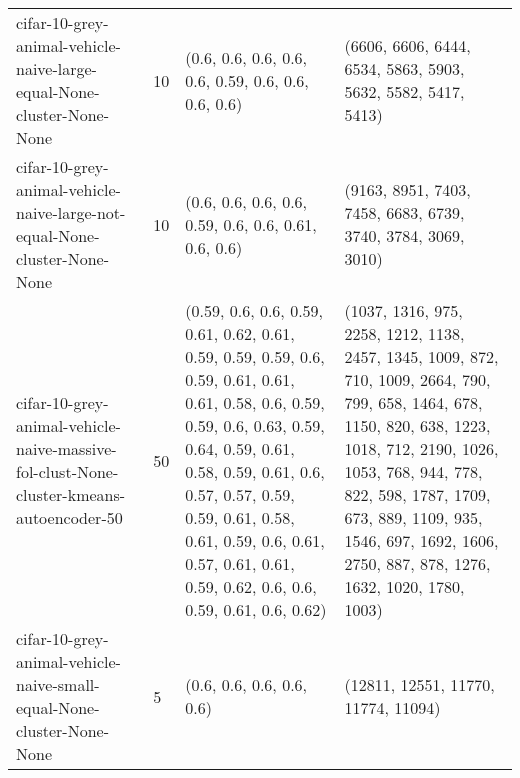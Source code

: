 \begin{longtable}{llll}
                                        cifar-10-grey-animal-vehicle-naive-large-equal-None-cluster-None-None &             10 &                                                                                                                                                                                                                                                       (0.6, 0.6, 0.6, 0.6, 0.6, 0.59, 0.6, 0.6, 0.6, 0.6) &                                                                                                                                                                                                                                              (6606, 6606, 6444, 6534, 5863, 5903, 5632, 5582, 5417, 5413) \\
                                    cifar-10-grey-animal-vehicle-naive-large-not-equal-None-cluster-None-None &             10 &                                                                                                                                                                                                                                                      (0.6, 0.6, 0.6, 0.6, 0.59, 0.6, 0.6, 0.61, 0.6, 0.6) &                                                                                                                                                                                                                                              (9163, 8951, 7403, 7458, 6683, 6739, 3740, 3784, 3069, 3010) \\
                      cifar-10-grey-animal-vehicle-naive-massive-fol-clust-None-cluster-kmeans-autoencoder-50 &             50 &        (0.59, 0.6, 0.6, 0.59, 0.61, 0.62, 0.61, 0.59, 0.59, 0.59, 0.6, 0.59, 0.61, 0.61, 0.61, 0.58, 0.6, 0.59, 0.59, 0.6, 0.63, 0.59, 0.64, 0.59, 0.61, 0.58, 0.59, 0.61, 0.6, 0.57, 0.57, 0.59, 0.59, 0.61, 0.58, 0.61, 0.59, 0.6, 0.61, 0.57, 0.61, 0.61, 0.59, 0.62, 0.6, 0.6, 0.59, 0.61, 0.6, 0.62) &                   (1037, 1316, 975, 2258, 1212, 1138, 2457, 1345, 1009, 872, 710, 1009, 2664, 790, 799, 658, 1464, 678, 1150, 820, 638, 1223, 1018, 712, 2190, 1026, 1053, 768, 944, 778, 822, 598, 1787, 1709, 673, 889, 1109, 935, 1546, 697, 1692, 1606, 2750, 887, 878, 1276, 1632, 1020, 1780, 1003) \\
                                        cifar-10-grey-animal-vehicle-naive-small-equal-None-cluster-None-None &              5 &                                                                                                                                                                                                                                                                                 (0.6, 0.6, 0.6, 0.6, 0.6) &                                                                                                                                                                                                                                                                       (12811, 12551, 11770, 11774, 11094) \\

\end{longtable}
